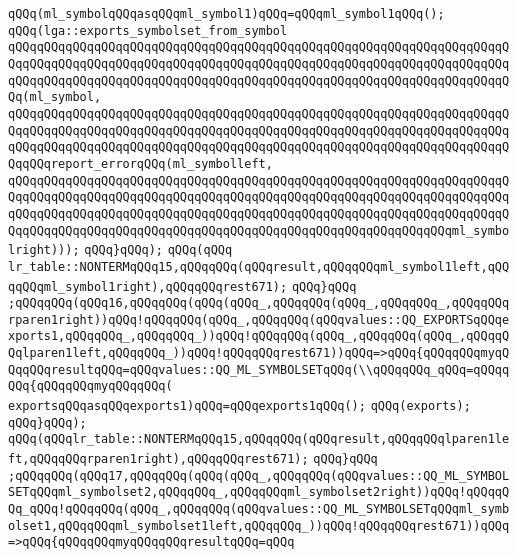 \verb|qQQq(ml_symbolqQQqasqQQqml_symbol1)qQQq=qQQqml_symbol1qQQq();|\newline
\verb|qQQq(lga::exports_symbolset_from_symbol|\newline
\verb|qQQqqQQqqQQqqQQqqQQqqQQqqQQqqQQqqQQqqQQqqQQqqQQqqQQqqQQqqQQqqQQqqQQqqQQqqQQqqQQqqQQqqQQqqQQqqQQqqQQqqQQqqQQqqQQqqQQqqQQqqQQqqQQqqQQqqQQqqQQqqQQqqQQqqQQqqQQqqQQqqQQqqQQqqQQqqQQqqQQqqQQqqQQqqQQqqQQqqQQqqQQqqQQqqQQq(ml_symbol,|\newline
\verb|qQQqqQQqqQQqqQQqqQQqqQQqqQQqqQQqqQQqqQQqqQQqqQQqqQQqqQQqqQQqqQQqqQQqqQQqqQQqqQQqqQQqqQQqqQQqqQQqqQQqqQQqqQQqqQQqqQQqqQQqqQQqqQQqqQQqqQQqqQQqqQQqqQQqqQQqqQQqqQQqqQQqqQQqqQQqqQQqqQQqqQQqqQQqqQQqqQQqqQQqqQQqqQQqqQQqqQQqreport_errorqQQq(ml_symbolleft,|\newline
\verb|qQQqqQQqqQQqqQQqqQQqqQQqqQQqqQQqqQQqqQQqqQQqqQQqqQQqqQQqqQQqqQQqqQQqqQQqqQQqqQQqqQQqqQQqqQQqqQQqqQQqqQQqqQQqqQQqqQQqqQQqqQQqqQQqqQQqqQQqqQQqqQQqqQQqqQQqqQQqqQQqqQQqqQQqqQQqqQQqqQQqqQQqqQQqqQQqqQQqqQQqqQQqqQQqqQQqqQQqqQQqqQQqqQQqqQQqqQQqqQQqqQQqqQQqqQQqqQQqqQQqqQQqqQQqqQQqml_symbolright)));|\newline
\verb|qQQq}qQQq);|\newline
\verb|qQQq(qQQq|\newline
\verb|lr_table::NONTERMqQQq15,qQQqqQQq(qQQqresult,qQQqqQQqml_symbol1left,qQQqqQQqml_symbol1right),qQQqqQQqrest671);|\newline
\verb|qQQq}qQQq|\newline
\verb|;qQQqqQQq(qQQq16,qQQqqQQq(qQQq(qQQq_,qQQqqQQq(qQQq_,qQQqqQQq_,qQQqqQQqrparen1right))qQQq!qQQqqQQq(qQQq_,qQQqqQQq(qQQqvalues::QQ_EXPORTSqQQqexports1,qQQqqQQq_,qQQqqQQq_))qQQq!qQQqqQQq(qQQq_,qQQqqQQq(qQQq_,qQQqqQQqlparen1left,qQQqqQQq_))qQQq!qQQqqQQqrest671))qQQq=>qQQq{qQQqqQQqmyqQQqqQQqresultqQQq=qQQqvalues::QQ_ML_SYMBOLSETqQQq(\\qQQqqQQq_qQQq=qQQqqQQq{qQQqqQQqmyqQQqqQQq(|\newline
\verb|exportsqQQqasqQQqexports1)qQQq=qQQqexports1qQQq();|\newline
\verb|qQQq(exports);|\newline
\verb|qQQq}qQQq);|\newline
\verb|qQQq(qQQqlr_table::NONTERMqQQq15,qQQqqQQq(qQQqresult,qQQqqQQqlparen1left,qQQqqQQqrparen1right),qQQqqQQqrest671);|\newline
\verb|qQQq}qQQq|\newline
\verb|;qQQqqQQq(qQQq17,qQQqqQQq(qQQq(qQQq_,qQQqqQQq(qQQqvalues::QQ_ML_SYMBOLSETqQQqml_symbolset2,qQQqqQQq_,qQQqqQQqml_symbolset2right))qQQq!qQQqqQQq_qQQq!qQQqqQQq(qQQq_,qQQqqQQq(qQQqvalues::QQ_ML_SYMBOLSETqQQqml_symbolset1,qQQqqQQqml_symbolset1left,qQQqqQQq_))qQQq!qQQqqQQqrest671))qQQq=>qQQq{qQQqqQQqmyqQQqqQQqresultqQQq=qQQq|\newline
